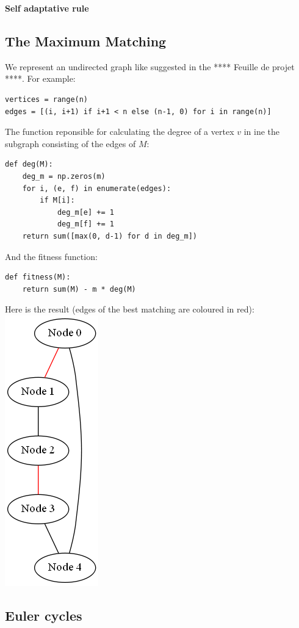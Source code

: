 \documentclass{article}
\begin{document}
\textbf{Self adaptative rule}

\subsection{The Maximum Matching}
We represent an undirected graph like suggested in the **** Feuille de projet ****. For example:

\begin{verbatim}
vertices = range(n)
edges = [(i, i+1) if i+1 < n else (n-1, 0) for i in range(n)]
\end{verbatim}

The function reponsible for calculating the degree of a vertex $v$ in ine the subgraph consisting of the edges of $M$:
\begin{verbatim}
def deg(M):
    deg_m = np.zeros(m)
    for i, (e, f) in enumerate(edges):
        if M[i]:
            deg_m[e] += 1
            deg_m[f] += 1
    return sum([max(0, d-1) for d in deg_m])
\end{verbatim}

And the fitness function:

\begin{verbatim}
def fitness(M): 
    return sum(M) - m * deg(M)
\end{verbatim}

Here is the result (edges of the best matching are coloured in red):\\
\includegraphics[scale=0.5]{img/max_graph.png}

\subsection{Euler cycles}
\end{document}
